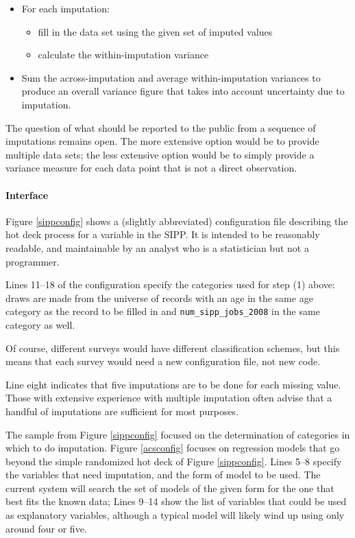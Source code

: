 \documentclass{article}
\newif\ifimputation
\def\tighten{ \setlength{\itemsep}{1pt}
    \setlength{\parskip}{0pt}}
\begin{document}
\begin{itemize}
\tighten
\item For each imputation:
    \begin{itemize}
\tighten
    \item fill in the data set using the given set of imputed values
    \item calculate the within-imputation variance
    \end{itemize}
\item Sum the across-imputation and average within-imputation variances to
produce an overall variance figure that takes into account uncertainty due to imputation.
\end{itemize}

The question of what should be reported to the public from a sequence of imputations
remains open. The more extensive option would be to provide multiple data sets; the less
extensive option would be to simply provide a variance measure for each data point that
is not a direct observation.


\ifimputation
        \paragraph{Interface} Figure \ref{sippconfig} shows a (slightly abbreviated) 
        configuration file describing the hot deck process for a variable in the SIPP.
        It is intended to be reasonably readable, and maintainable by an analyst who is
        a statistician but not a programmer. 

        Lines 11--18 of the configuration specify the
        categories used for step (1) above: draws are made from the universe of records with an
        age in the same age category as the record to be filled in and {\tt num\_sipp\_jobs\_2008} in the same
        category as well.

        Of course, different surveys would have different classification schemes, but
        this means that each survey would need a new configuration file, not new code.

        Line eight indicates that five imputations are to be done for each missing
        value. Those with extensive experience with multiple imputation often advise
        that a handful of imputations are sufficient for most purposes.

        The sample from 
        Figure \ref{sippconfig} focused on the determination of categories in which to
        do imputation. Figure \ref{acsconfig} focuses on regression models that go
        beyond the simple randomized hot deck of Figure \ref{sippconfig}. Lines 5--8
        specify the variables that need imputation, and the form of model to be used.
        The current system will search the set of models of the given form for the one
        that best fits the known data; Lines 9--14 show the list of variables that could be
        used as explanatory variables, although a typical model will likely wind up
        using only around four or five.
\end{document}
